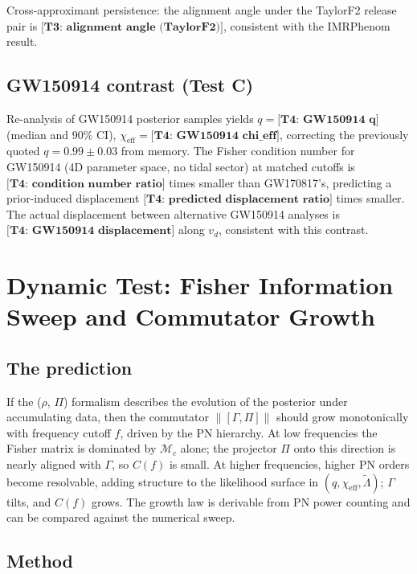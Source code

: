 \documentclass[twocolumn,prd,showpacs,superscriptaddress]{revtex4-2}
\newcommand{\Mchirp}{\mathcal{M}_c}
\newcommand{\Lambdatilde}{\tilde{\Lambda}}
\newcommand{\chieff}{\chi_{\text{eff}}}
\newcommand{\vd}{v_{d}}          %
\newcommand{\manifest}[1]{\textbf{[#1]}}
\begin{document}
Cross-approximant persistence: the alignment angle under the
TaylorF2 release pair is $\manifest{T3: alignment angle (TaylorF2)}$,
consistent with the IMRPhenom result.

\subsection{GW150914 contrast (Test C)}

Re-analysis of GW150914 posterior samples yields
$q = \manifest{T4: GW150914 q}$ (median and 90\% CI),
$\chieff = \manifest{T4: GW150914 chi_eff}$, correcting the
previously quoted $q = 0.99 \pm 0.03$ from memory.  The Fisher
condition number for GW150914 (4D parameter space, no tidal sector)
at matched cutoffs is $\manifest{T4: condition number ratio}$ times
smaller than GW170817's, predicting a prior-induced displacement
$\manifest{T4: predicted displacement ratio}$ times smaller.
The actual displacement between alternative GW150914 analyses is
$\manifest{T4: GW150914 displacement}$ along $\vd$, consistent with
this contrast.


\section{Dynamic Test: Fisher Information Sweep and Commutator Growth}
\label{sec:dynamic}

\subsection{The prediction}

If the ($\rho$, $\Pi$) formalism describes the evolution of the
posterior under accumulating data, then the commutator
$\|[\Gamma, \Pi]\|$ should grow monotonically with frequency cutoff
$f$, driven by the PN hierarchy.  At low frequencies the Fisher matrix
is dominated by $\Mchirp$ alone; the projector $\Pi$ onto this direction
is nearly aligned with $\Gamma$, so $C(f)$ is small.  At higher
frequencies, higher PN orders become resolvable, adding structure to
the likelihood surface in $(q, \chieff, \Lambdatilde)$; $\Gamma$ tilts,
and $C(f)$ grows.  The growth law is derivable from PN power counting
and can be compared against the numerical sweep.

\subsection{Method}
\end{document}
